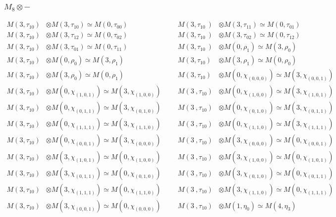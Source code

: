 \subsubsection{$M_8\otimes -$}
\begin{align*}
M(3,\tau_{10}) &\otimes M(3,\tau_{10}) \simeq M(0,\tau_{00}) &&& M(3,\tau_{10}\
) &\otimes M(3,\tau_{11}) \simeq M(0,\tau_{01})\\
M(3,\tau_{10}) &\otimes M(3,\tau_{12}) \simeq M(0,\tau_{02}) &&& M(3,\tau_{10}\
) &\otimes M(3,\tau_{02}) \simeq M(0,\tau_{12})\\
M(3,\tau_{10}) &\otimes M(3,\tau_{01}) \simeq M(0,\tau_{11}) &&& M(3,\tau_{10}\
) &\otimes M(0,\rho_{1}) \simeq M(3,\rho_{0})\\
M(3,\tau_{10}) &\otimes M(0,\rho_{0}) \simeq M(3,\rho_{1}) &&& M(3,\tau_{10}) \
&\otimes M(3,\rho_{1}) \simeq M(0,\rho_{0})\\
M(3,\tau_{10}) &\otimes M(3,\rho_{0}) \simeq M(0,\rho_{1}) &&& M(3,\tau_{10}) \
&\otimes M(0,\chi_{(0,0,0)}) \simeq M(3,\chi_{(0,0,1)})\\
M(3,\tau_{10}) &\otimes M(0,\chi_{(1,0,1)}) \simeq M(3,\chi_{(1,0,0)}) &&& M(3\
,\tau_{10}) &\otimes M(0,\chi_{(1,0,0)}) \simeq M(3,\chi_{(1,0,1)})\\
M(3,\tau_{10}) &\otimes M(0,\chi_{(0,1,1)}) \simeq M(3,\chi_{(0,1,0)}) &&& M(3\
,\tau_{10}) &\otimes M(0,\chi_{(0,1,0)}) \simeq M(3,\chi_{(0,1,1)})\\
M(3,\tau_{10}) &\otimes M(0,\chi_{(1,1,1)}) \simeq M(3,\chi_{(1,1,0)}) &&& M(3\
,\tau_{10}) &\otimes M(0,\chi_{(1,1,0)}) \simeq M(3,\chi_{(1,1,1)})\\
M(3,\tau_{10}) &\otimes M(0,\chi_{(0,0,1)}) \simeq M(3,\chi_{(0,0,0)}) &&& M(3\
,\tau_{10}) &\otimes M(3,\chi_{(0,0,0)}) \simeq M(0,\chi_{(0,0,1)})\\
M(3,\tau_{10}) &\otimes M(3,\chi_{(1,0,1)}) \simeq M(0,\chi_{(1,0,0)}) &&& M(3\
,\tau_{10}) &\otimes M(3,\chi_{(1,0,0)}) \simeq M(0,\chi_{(1,0,1)})\\
M(3,\tau_{10}) &\otimes M(3,\chi_{(0,1,1)}) \simeq M(0,\chi_{(0,1,0)}) &&& M(3\
,\tau_{10}) &\otimes M(3,\chi_{(0,1,0)}) \simeq M(0,\chi_{(0,1,1)})\\
M(3,\tau_{10}) &\otimes M(3,\chi_{(1,1,1)}) \simeq M(0,\chi_{(1,1,0)}) &&& M(3\
,\tau_{10}) &\otimes M(3,\chi_{(1,1,0)}) \simeq M(0,\chi_{(1,1,1)})\\
M(3,\tau_{10}) &\otimes M(3,\chi_{(0,0,1)}) \simeq M(0,\chi_{(0,0,0)}) &&& M(3\
,\tau_{10}) &\otimes M(1,\eta_{0}) \simeq M(4,\eta_{3})\\

\end{align*}
